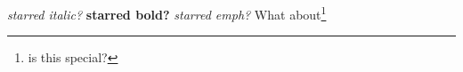\documentclass{amsart}
\begin{document}
\textit*{starred italic?}
\textbf*{starred bold?}
\emph*{starred emph?}
What about\footnote[10000]{is this special?}
\end{document}
